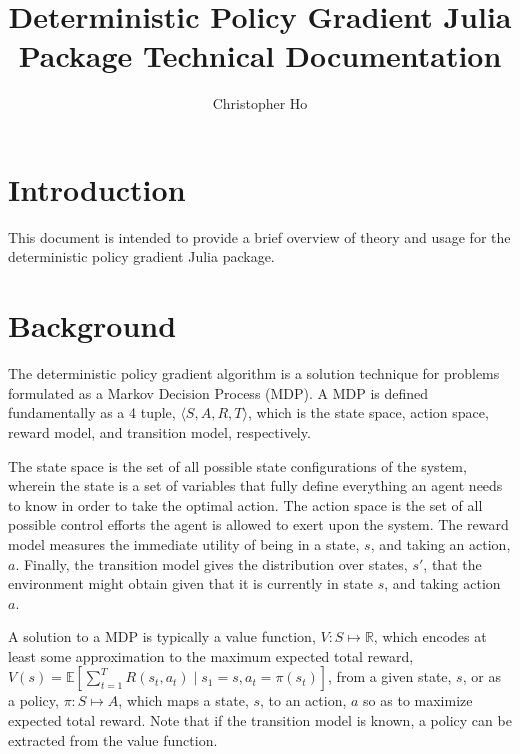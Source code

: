 \documentclass[a4paper]{article}
\title{Deterministic Policy Gradient Julia Package Technical Documentation}
\author{Christopher Ho}
\begin{document}
\maketitle

\section{Introduction}
This document is intended to provide a brief overview of theory and usage for the deterministic policy gradient Julia package.

\section{Background}
The deterministic policy gradient algorithm is a solution technique for problems formulated as a Markov Decision Process (MDP). A MDP is defined fundamentally as a 4 tuple, $\langle S,A,R,T \rangle$, which is the state space, action space, reward model, and transition model, respectively. 

The state space is the set of all possible state configurations of the system, wherein the state is a set of variables that fully define everything an agent needs to know in order to take the optimal action. The action space is the set of all possible control efforts the agent is allowed to exert upon the system. The reward model measures the immediate utility of being in a state, $s$, and taking an action, $a$. Finally, the transition model gives the distribution over states, $s'$, that the environment might obtain given that it is currently in state $s$, and taking action $a$.

A solution to a MDP is typically a value function, $V: S \mapsto\mathbb{R}$, which encodes at least some approximation to the maximum expected total reward, $V(s) = \mathbb{E} [\sum\limits_{t=1}^{T} R(s_t,a_t)\mid s_1 = s, a_t = \pi(s_t)]$, from a given state, $s$, or as a policy, $\pi: S \mapsto A$, which maps a state, $s$, to an action, $a$ so as to maximize expected total reward. Note that if the transition model is known, a policy can be extracted from the value function. 
\end{document}
